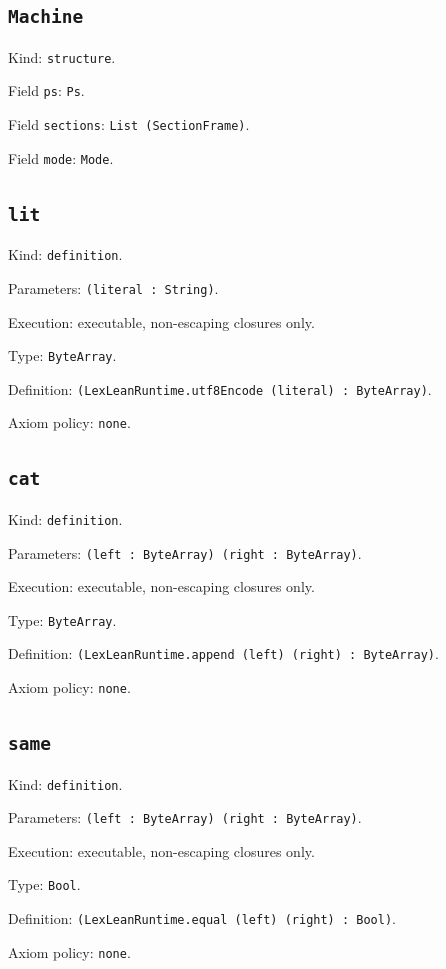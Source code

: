 \documentclass[11pt]{article}
\begin{document}
\subsection*{\texttt{Machine}}
\noindent Kind: \texttt{structure}.\par
\noindent Field \texttt{ps}: \texttt{Ps}.\par
\noindent Field \texttt{sections}: \texttt{List (SectionFrame)}.\par
\noindent Field \texttt{mode}: \texttt{Mode}.\par
\subsection*{\texttt{lit}}
\noindent Kind: \texttt{definition}.\par
\noindent Parameters: \texttt{(literal : String)}.\par
\noindent Execution: executable, non-escaping closures only.\par
\noindent Type: \texttt{ByteArray}.\par
\noindent Definition: \texttt{(LexLeanRuntime.utf8Encode (literal) : ByteArray)}.\par
\noindent Axiom policy: \texttt{none}.\par
\subsection*{\texttt{cat}}
\noindent Kind: \texttt{definition}.\par
\noindent Parameters: \texttt{(left : ByteArray) (right : ByteArray)}.\par
\noindent Execution: executable, non-escaping closures only.\par
\noindent Type: \texttt{ByteArray}.\par
\noindent Definition: \texttt{(LexLeanRuntime.append (left) (right) : ByteArray)}.\par
\noindent Axiom policy: \texttt{none}.\par
\subsection*{\texttt{same}}
\noindent Kind: \texttt{definition}.\par
\noindent Parameters: \texttt{(left : ByteArray) (right : ByteArray)}.\par
\noindent Execution: executable, non-escaping closures only.\par
\noindent Type: \texttt{Bool}.\par
\noindent Definition: \texttt{(LexLeanRuntime.equal (left) (right) : Bool)}.\par
\noindent Axiom policy: \texttt{none}.\par
\end{document}
